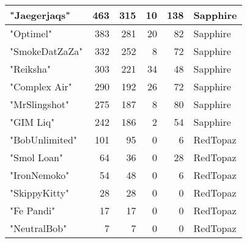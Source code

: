 \documentclass{article}
\begin{document}
\begin{table}[htbp]
\begin{tabular}{|l|r|r|r|r|l|}
"Jaegerjaqs" & 463 & 315 & 10 & 138 & Sapphire \\ \hline
"Optimel" & 383 & 281 & 20 & 82 & Sapphire \\ \hline
"SmokeDatZaZa" & 332 & 252 & 8 & 72 & Sapphire \\ \hline
"Reiksha" & 303 & 221 & 34 & 48 & Sapphire \\ \hline
"Complex Air" & 290 & 192 & 26 & 72 & Sapphire \\ \hline
"MrSlingshot" & 275 & 187 & 8 & 80 & Sapphire \\ \hline
"GIM Liq" & 242 & 186 & 2 & 54 & Sapphire \\ \hline
"BobUnlimited" & 101 & 95 & 0 & 6 & RedTopaz \\ \hline
"Smol Loan" & 64 & 36 & 0 & 28 & RedTopaz \\ \hline
"IronNemoko" & 54 & 48 & 0 & 6 & RedTopaz \\ \hline
"SkippyKitty" & 28 & 28 & 0 & 0 & RedTopaz \\ \hline
"Fe Pandi" & 17 & 17 & 0 & 0 & RedTopaz \\ \hline
"NeutralBob" & 7 & 7 & 0 & 0 & RedTopaz \\ \hline
\end{tabular}
\end{table}
\end{document}
